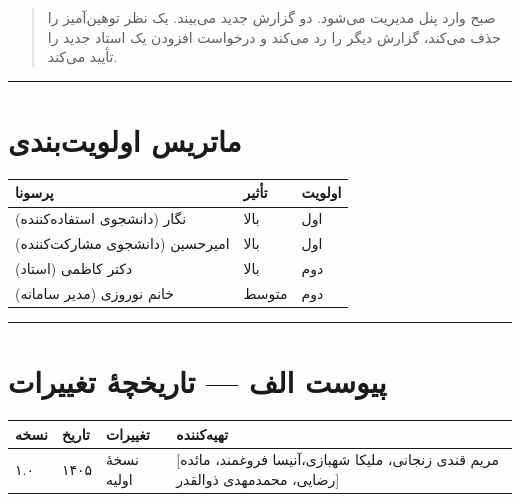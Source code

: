 \documentclass[12pt, a4paper]{article}
\begin{document}
\begin{quote}
صبح وارد پنل مدیریت می‌شود. دو گزارش جدید می‌بیند. یک نظر توهین‌آمیز را حذف می‌کند،
گزارش دیگر را رد می‌کند و درخواست افزودن یک استاد جدید را تأیید می‌کند.
\end{quote}

\begin{center}\rule{0.5\linewidth}{0.5pt}\end{center}

\section{ماتریس اولویت‌بندی}

{\def\LTcaptype{none} %
\begin{longtable}[]{@{}lll@{}}
\toprule\noalign{}
پرسونا & تأثیر & اولویت \\
\midrule\noalign{}
\endhead
\bottomrule\noalign{}
\endlastfoot
نگار (دانشجوی استفاده‌کننده) & بالا & اول \\
امیرحسین (دانشجوی مشارکت‌کننده) & بالا & اول \\
دکتر کاظمی (استاد) & بالا & دوم \\
خانم نوروزی (مدیر سامانه) & متوسط & دوم \\
\end{longtable}
}

\begin{center}\rule{0.5\linewidth}{0.5pt}\end{center}

\section*{پیوست الف — تاریخچهٔ تغییرات}

{\def\LTcaptype{none} %
\begin{longtable}[]{@{}
  >{\raggedright\arraybackslash}p{}
  >{\raggedright\arraybackslash}p{}
  >{\raggedright\arraybackslash}p{}
  >{\raggedright\arraybackslash}p{}@{}}
\toprule\noalign{}
\begin{minipage}[b]{\linewidth}\raggedright
نسخه
\end{minipage} & \begin{minipage}[b]{\linewidth}\raggedright
تاریخ
\end{minipage} & \begin{minipage}[b]{\linewidth}\raggedright
تغییرات
\end{minipage} & \begin{minipage}[b]{\linewidth}\raggedright
تهیه‌کننده
\end{minipage} \\
\midrule\noalign{}
\endhead
\bottomrule\noalign{}
\endlastfoot
۱.۰ & ۱۴۰۵ & نسخهٔ اولیه & {[}مریم قندی زنجانی، ملیکا شهبازی،آنیسا فروغمند، مائده رضایی، محمدمهدی ذوالقدر{]} \\
\end{longtable}
}
\end{document}
